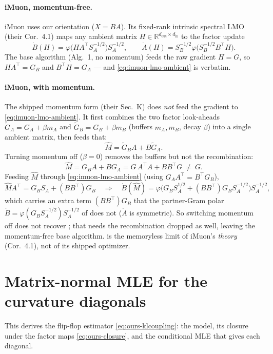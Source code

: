 \documentclass[11pt]{article}
\newcommand{\R}{\mathbb{R}}
\newcommand{\polar}{\varphi}                 %
\theoremstyle{plain}
\theoremstyle{definition}
\theoremstyle{remark}
\begin{document}
\paragraph{iMuon, momentum-free.} iMuon uses our orientation ($X=BA$). Its fixed-rank
intrinsic spectral LMO (their Cor.~4.1) maps any ambient matrix
$H\in\R^{d_{\mathrm{out}}\times d_{\mathrm{in}}}$ to the factor update
\begin{equation}
  \dot B(H)=\polar\!\big(HA^\top S_A^{-1/2}\big)S_A^{-1/2},\qquad
  \dot A(H)=S_B^{-1/2}\polar\!\big(S_B^{-1/2}B^\top H\big).
  \label{eq:imuon-lmo-ambient}
\end{equation}
The base algorithm (Alg.~1, no momentum) feeds the raw gradient $H=G$, so $HA^\top=G_B$ and
$B^\top H=G_A$ --- and \eqref{eq:imuon-lmo-ambient} is  verbatim.

\paragraph{iMuon, with momentum.} The shipped momentum form (their Sec.~K) does \emph{not}
feed the gradient to \eqref{eq:imuon-lmo-ambient}. It first combines the two factor
look-aheads $\tilde G_A=G_A+\beta m_A$ and $\tilde G_B=G_B+\beta m_B$ (buffers $m_A,m_B$,
decay $\beta$) into a single ambient matrix, then feeds that:
\begin{equation*}
  \widehat M=\tilde G_B A+B\tilde G_A .
\end{equation*}
Turning momentum off ($\beta{=}0$) removes the buffers but not the recombination:
\begin{equation*}
  \widehat M=G_B A+B G_A=G\,A^\top A+BB^\top G\ \neq\ G .
\end{equation*}
Feeding $\widehat M$ through \eqref{eq:imuon-lmo-ambient} (using $G_A A^\top=B^\top G_B$),
\begin{equation*}
  \widehat M A^\top=G_B S_A+(BB^\top)G_B
  \quad\Longrightarrow\quad
  \dot B(\widehat M)=\polar\!\big(G_B S_A^{1/2}+(BB^\top)G_B S_A^{-1/2}\big)S_A^{-1/2},
\end{equation*}
which carries an extra term $(BB^\top)G_B$ that the partner-Gram polar
$\dot B=\polar(G_B S_A^{-1/2})S_A^{-1/2}$ of  does not ($\dot A$ is symmetric).
So switching momentum off does not recover ; that needs the recombination
dropped as well, leaving the momentum-free base algorithm.  is the
memoryless limit of iMuon's \emph{theory} (Cor.~4.1), not of its shipped optimizer.

\section{Matrix-normal MLE for the curvature diagonals}
\label{app:matnormal}
This derives the flip-flop estimator \eqref{eq:ours-klcoupling}: the model, its closure
under the factor maps \eqref{eq:ours-closure}, and the conditional MLE that gives each
diagonal.
\end{document}
